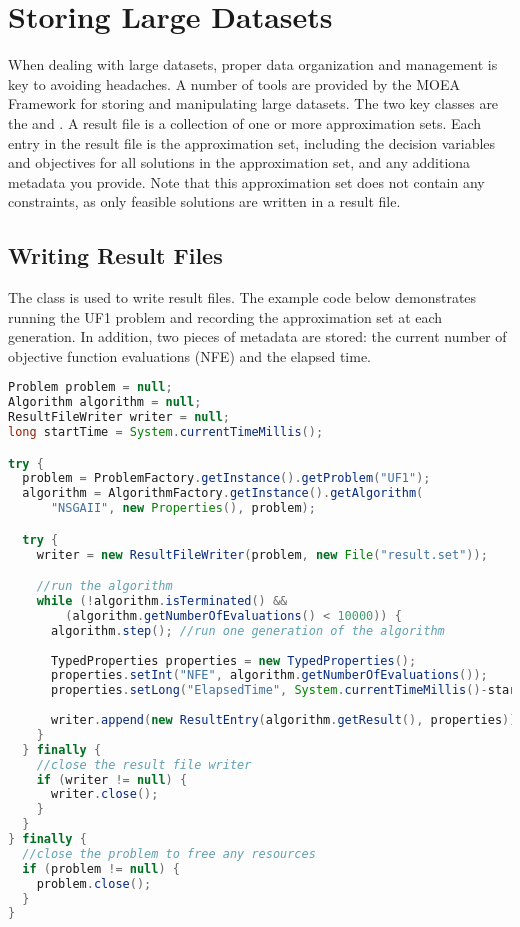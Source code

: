\section{Storing Large Datasets}
When dealing with large datasets, proper data organization and management is key to avoiding headaches.  A number of tools are provided by the MOEA Framework for storing and manipulating large datasets.  The two key classes are the  and .  A result file is a collection of one or more approximation sets.  Each entry in the result file is the approximation set, including the decision variables and objectives for all solutions in the approximation set, and any additiona metadata you provide.  Note that this approximation set does not contain any constraints, as only feasible solutions are written in a result file.

\subsection{Writing Result Files}

The  class is used to write result files.  The example code below demonstrates running the UF1 problem and recording the approximation set at each generation.  In addition, two pieces of metadata are stored: the current number of objective function evaluations (NFE) and the elapsed time.

\begin{lstlisting}[language=Java]
Problem problem = null;
Algorithm algorithm = null;
ResultFileWriter writer = null;
long startTime = System.currentTimeMillis();

try {
  problem = ProblemFactory.getInstance().getProblem("UF1");  
  algorithm = AlgorithmFactory.getInstance().getAlgorithm(
      "NSGAII", new Properties(), problem);

  try {
    writer = new ResultFileWriter(problem, new File("result.set"));

    //run the algorithm
    while (!algorithm.isTerminated() && 
        (algorithm.getNumberOfEvaluations() < 10000)) {
      algorithm.step(); //run one generation of the algorithm
    
      TypedProperties properties = new TypedProperties();
      properties.setInt("NFE", algorithm.getNumberOfEvaluations());
      properties.setLong("ElapsedTime", System.currentTimeMillis()-start);
      
      writer.append(new ResultEntry(algorithm.getResult(), properties));
    }
  } finally {
    //close the result file writer
    if (writer != null) {
      writer.close();
    }
  }
} finally {
  //close the problem to free any resources
  if (problem != null) {
    problem.close(); 
  }
}
\end{lstlisting}

